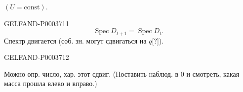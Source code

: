 $(U=\mathrm{const})$.


\begin{GelfandAdjacentEvidence}{GELFAND-P000371}{1}
\begin{equation*}\operatorname{Spec}D_{t+1}=\operatorname{Spec}D_t.\end{equation*}
Спектр двигается (соб. зн. могут сдвигаться на $q$[?]).
\end{GelfandAdjacentEvidence}
\begin{GelfandAdjacentEvidence}{GELFAND-P000371}{2}

Можно опр.  число, хар. этот сдвиг.
(Поставить наблюд. в $0$ и смотреть, какая масса прошла влево и вправо.)




\end{GelfandAdjacentEvidence}
